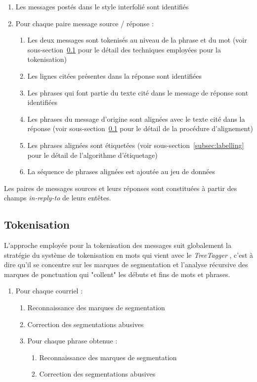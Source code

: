\begin{enumerate}
    \item Les messages postés dans le style interfolié sont identifiés
    \item Pour chaque paire message source / réponse :
    \begin{enumerate}
        \item Les deux messages sont tokenisés au niveau de la phrase et du mot (voir sous-section~\ref{subsec:tokenization} pour le détail des techniques employées pour la tokenisation)
        \item Les lignes citées présentes dans la réponse sont identifiées
        \item Les phrases qui font partie du texte cité dans le message de réponse sont identifiées
        \item Les phrases du message d'origine sont alignées avec le texte cité dans la réponse (voir sous-section~\ref{subsec:tokenization} pour le détail de la procédure d'alignement)
        \item Les phrases alignées sont étiquetées (voir sous-section~\ref{subsec:labelling} pour le détail de l'algorithme d'étiquetage)
        \item La séquence de phrases alignées est ajoutée au jeu de données
    \end{enumerate}
\end{enumerate}

Les paires de messages sources et leurs réponses sont constituées à partir des champs \emph{in-reply-to} de leurs entêtes.


\subsection{Tokenisation}

\label{subsec:tokenization}

L'approche employée pour la tokenisation des messages suit globalement la stratégie du système de tokenisation en mots qui vient avec le \textit{TreeTagger} \cite{schmid:94b}, c'est à dire qu'il se concentre sur les marques de segmentation et l'analyse récursive des marques de ponctuation qui "collent" les débuts et fins de mots et phrases.

\begin{enumerate}
    \item[] Pour chaque courriel :
    \begin{enumerate}
        \item Reconnaissance des marques de segmentation
        \item Correction des segmentations abusives
        \item Pour chaque phrase obtenue :
        \begin{enumerate}
            \item Reconnaissance des marques de segmentation
            \item Correction des segmentations abusives
        \end{enumerate}
    \end{enumerate}
\end{enumerate}

